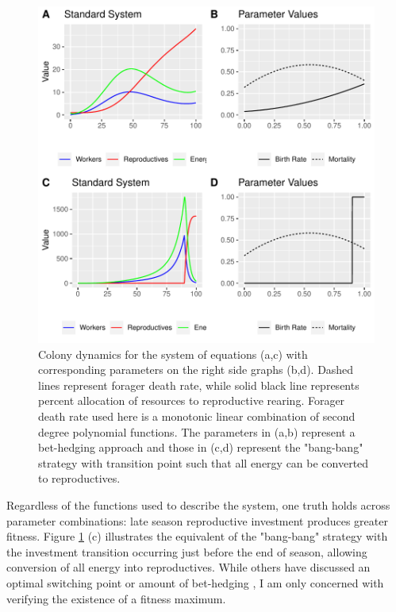 \documentclass[12pt]{report}
\begin{document}
\begin{figure}[t]
\centering
\includegraphics{SweaveDoc-005}
\caption{Colony dynamics for the system of equations (a,c) with corresponding parameters on the right side graphs (b,d). Dashed lines represent forager death rate, while solid black line represents percent allocation of resources to reproductive rearing. Forager death rate used here is a monotonic linear combination of second degree polynomial functions. The parameters in (a,b) represent a bet-hedging approach and those in (c,d) represent the "bang-bang" strategy with transition point such that all energy can be converted to reproductives.}
\label{fig: Continuous dynamics}
\end{figure}
 
Regardless of the functions used to describe the system, one truth holds across parameter combinations: late season reproductive investment produces greater fitness. Figure \ref{fig: Continuous dynamics} (c)  illustrates the equivalent of the "bang-bang" strategy with the investment transition occurring just before the end of season, allowing conversion of all energy into reproductives. While others have discussed an optimal switching point or amount of bet-hedging \cite{poitrineau2009workers}, I am only concerned with verifying the existence of a fitness maximum. 
\end{document}
